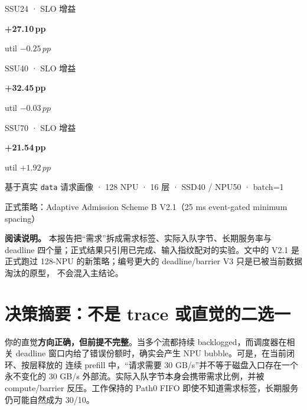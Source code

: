 \documentclass[UTF8,fontset=none,10pt,a4paper]{ctexart}
\newcommand{\code}[1]{\texttt{\small #1}}
\newcommand{\pp}{\,pp}
\begin{document}
\begin{titlepage}
\vfill
\begin{minipage}[t]{.29\textwidth}
  {\color{white!60}\sffamily\small SSU24 · SLO 增益}\par
  {\color{white}\sffamily\bfseries\fontsize{22}{26}\selectfont +27.10\pp}\par
  {\color{white!65}\small util $-0.25\pp$}
\end{minipage}\hfill
\begin{minipage}[t]{.29\textwidth}
  {\color{white!60}\sffamily\small SSU40 · SLO 增益}\par
  {\color{white}\sffamily\bfseries\fontsize{22}{26}\selectfont +32.45\pp}\par
  {\color{white!65}\small util $-0.03\pp$}
\end{minipage}\hfill
\begin{minipage}[t]{.29\textwidth}
  {\color{white!60}\sffamily\small SSU70 · SLO 增益}\par
  {\color{white}\sffamily\bfseries\fontsize{22}{26}\selectfont +21.54\pp}\par
  {\color{white!65}\small util $+1.92\pp$}
\end{minipage}

\vspace{14mm}
{\sffamily\color{white!55}\small
基于真实 \code{data} 请求画像 · 128 NPU · 16 层 · SSD40 / NPU50 · batch=1\par
正式策略：Adaptive Admission Scheme B V2.1（25 ms event-gated minimum spacing）}
\end{titlepage}

\begin{tcolorbox}[enhanced,colback=Paper,colframe=Line,boxrule=.5pt,arc=2mm,
  left=4mm,right=4mm,top=3mm,bottom=3mm]
\textbf{阅读说明。} 本报告把“需求”拆成需求标签、实际入队字节、长期服务率与 deadline
四个量；正式结果只引用已完成、输入指纹配对的实验。文中的 V2.1 是正式跑过
128-NPU 的新策略；编号更大的 deadline/barrier V3 只是已被当前数据淘汰的原型，
不会混入主结论。
\end{tcolorbox}
\tableofcontents
\clearpage
{}

\section{决策摘要：不是 trace 或直觉的二选一}

\begin{verdictbox}
你的直觉\textbf{方向正确，但前提不完整}。当多个流都持续 backlogged，而调度器在相关
deadline 窗口内给了错误份额时，确实会产生 NPU bubble。可是，在当前闭环、按层释放的
连续 prefill 中，“请求需要 30 GB/s”并不等于磁盘入口存在一个永不变化的 30 GB/s
外部流。实际入队字节本身会携带需求比例，并被 compute/barrier 反压。工作保持的
Path0 FIFO 即使不知道需求标签，长期服务仍可能自然成为 30/10。
\end{verdictbox}
\end{document}
